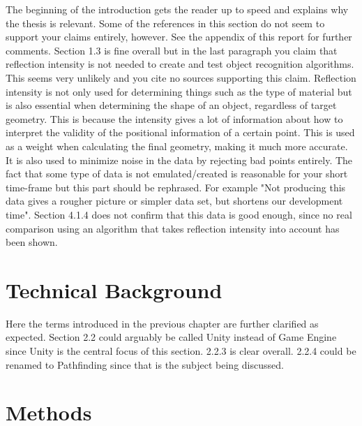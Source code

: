 \documentclass[12pt,a4paper,twoside,openright]{report}
\begin{document}
	The beginning of the introduction gets the reader up to speed and explains
	why the thesis is relevant. Some of the references in this section do not
	seem to support your claims entirely, however. See the appendix of this
	report for further comments. Section 1.3 is fine overall but in the last
	paragraph you claim that reflection intensity is not needed to create and
	test object recognition algorithms. This seems very unlikely and you cite
	no sources supporting this claim. Reflection intensity is not only used for
	determining things such as the type of material but is also essential when
	determining the shape of an object, regardless of target geometry. This is
	because the intensity gives a lot of information about how to interpret the
	validity of the positional information of a certain point. This is used as
	a weight when calculating the final geometry, making it much more accurate.
	It is also used to minimize noise in the data by rejecting bad points
	entirely. The fact that some type of data is not emulated/created is
	reasonable for your short time-frame but this part should be rephrased. For
	example "Not producing this data gives a rougher picture or simpler data
	set, but shortens our development time". Section 4.1.4 does not confirm
	that this data is good enough, since no real comparison using an algorithm
	that takes reflection intensity into account has been shown. 

\section*{Technical Background}

	Here the terms introduced in the previous chapter are further clarified as
	expected. Section 2.2 could arguably be called Unity instead of Game Engine
	since Unity is the central focus of this section. 2.2.3 is clear overall.
	2.2.4 could be renamed to Pathfinding since that is the subject being
	discussed. 

\section*{Methods}
\end{document}
